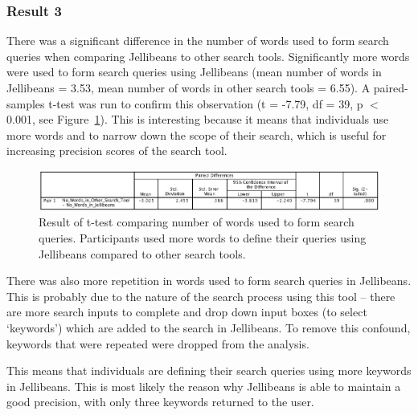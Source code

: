 \documentclass[a4paper, 11pt]{article}
\begin{document}
\subsubsection{Result 3}
There was a significant difference in the number of words used to form search queries when comparing Jellibeans to other search tools. Significantly more words were used to form search queries using Jellibeans (mean number of words in Jellibeans = 3.53, mean number of words in other search tools = 6.55). A paired-samples t-test was run to confirm this observation (t = -7.79, df = 39, p $<$ 0.001, see Figure~\ref{result3}). This is interesting because it means that individuals use more words and to narrow down the scope of their search, which is useful for increasing precision scores of the search tool.

\begin{figure}[H]
\begin{center}
\includegraphics[scale=0.47]{Result3}
\caption{Result of t-test comparing number of words used to form search queries. Participants used more words to define their queries using Jellibeans compared to other search tools.}
\label{result3}
\end{center}
\end{figure}

There was also more repetition in words used to form search queries in Jellibeans. This is probably due to the nature of the search process using this tool -- there are more search inputs to complete and drop down input boxes (to select `keywords') which are added to the search in Jellibeans. To remove this confound, keywords that were repeated were dropped from the analysis.

\vspace{5mm}
This means that individuals are defining their search queries using more keywords in Jellibeans. This is most likely the reason why Jellibeans is able to maintain a good precision, with only three keywords returned to the user. 
\end{document}
